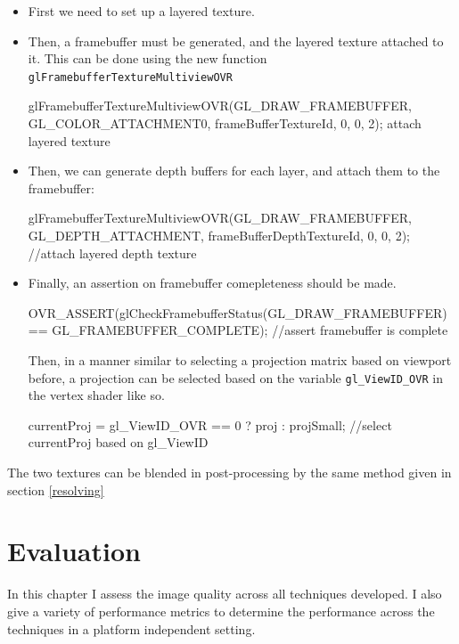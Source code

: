 \documentclass[12pt,a4paper,twoside,openright]{report}
\begin{document}
\begin{itemize}

\item First we need to set up a layered texture.

\item Then, a framebuffer must be generated, and the layered texture attached to it. This can be done using the new function \texttt{glFramebufferTextureMultiviewOVR}
\begin{blockcode}
glFramebufferTextureMultiviewOVR(GL_DRAW_FRAMEBUFFER, GL_COLOR_ATTACHMENT0, frameBufferTextureId, 0, 0, 2); attach layered texture
\end{blockcode}

\item Then, we can generate depth buffers for each layer, and attach them to the framebuffer:
\begin{blockcode}
glFramebufferTextureMultiviewOVR(GL_DRAW_FRAMEBUFFER, GL_DEPTH_ATTACHMENT, frameBufferDepthTextureId, 0, 0, 2); //attach layered depth texture
\end{blockcode}
\item Finally, an assertion on framebuffer comepleteness should be made.
\begin{blockcode}
OVR_ASSERT(glCheckFramebufferStatus(GL_DRAW_FRAMEBUFFER) == GL_FRAMEBUFFER_COMPLETE); //assert framebuffer is complete
\end{blockcode}

Then, in a manner similar to selecting a projection matrix based on viewport before, a projection can be selected based on the variable \texttt{gl\_ViewID\_OVR} in the vertex shader like so.

\begin{blockcode}
currentProj = gl_ViewID_OVR == 0 ? proj : projSmall; //select currentProj based on gl_ViewID 
\end{blockcode}

\end{itemize}

The two textures can be blended in post-processing by the same method given in section \ref{resolving}

\chapter{Evaluation}

In this chapter I assess the image quality across all techniques developed. I also give a variety of performance metrics to determine the performance across the techniques in a platform independent setting.
\end{document}
